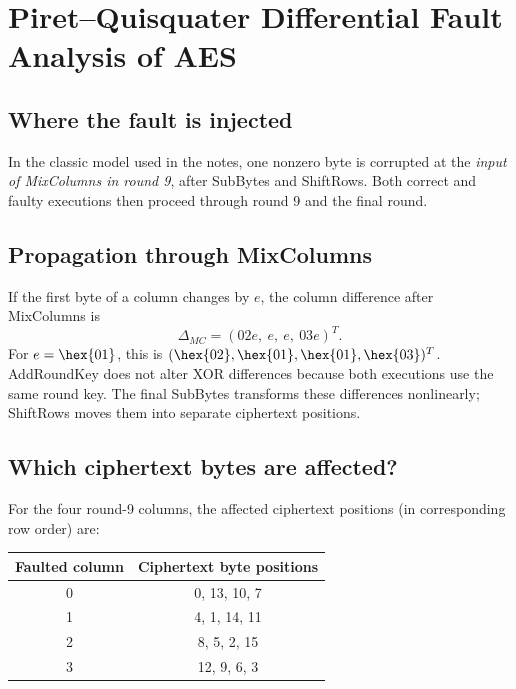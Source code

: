 \chapter{Piret--Quisquater Differential Fault Analysis of AES}
\section{Where the fault is injected}
In the classic model used in the notes, one nonzero byte is corrupted at the \emph{input of MixColumns in round 9}, after SubBytes and ShiftRows. Both correct and faulty executions then proceed through round 9 and the final round.
\begin{center}\end{center}
\section{Propagation through MixColumns}
If the first byte of a column changes by \(e\), the column difference after MixColumns is
\[\Delta_{MC}=(02e,\ e,\ e,\ 03e)^T.\]
For \(e=\hex{01}\), this is \((\hex{02},\hex{01},\hex{01},\hex{03})^T\). AddRoundKey does not alter XOR differences because both executions use the same round key. The final SubBytes transforms these differences nonlinearly; ShiftRows moves them into separate ciphertext positions.
\section{Which ciphertext bytes are affected?}
For the four round-9 columns, the affected ciphertext positions (in corresponding row order) are:
\begin{center}\begin{tabular}{cc}\toprule Faulted column & Ciphertext byte positions\\\midrule 0&0, 13, 10, 7\\1&4, 1, 14, 11\\2&8, 5, 2, 15\\3&12, 9, 6, 3\\\bottomrule\end{tabular}\end{center}

